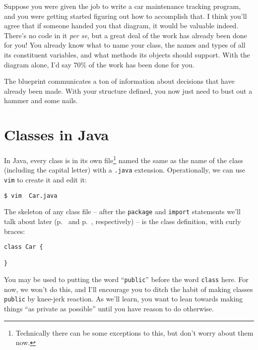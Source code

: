 Suppose you were given the job to write a car maintenance tracking program, and
you were getting started figuring out how to accomplish that. I think you'll
agree that if someone handed you that diagram, it would be valuable indeed.
There's no code in it \textit{per se}, but a great deal of the work has already
been done for you! You already know what to name your class, the names and
types of all its constituent variables, and what methods its objects should
support. With the diagram alone, I'd say 70\% of the work has been done for
you.

The blueprint communicates a ton of information about decisions that have
already been made. With your structure defined, you now just need to bust out a
hammer and some nails.


\section{Classes in Java}

In Java, every class is in its own file\footnote{Technically there can be
some exceptions to this, but don't worry about them now.} named the same as
the name of the class (including the capital letter) with a \texttt{.java}
extension. Operationally, we can use \texttt{vim} to create it and edit it:

\begin{verbatim}
$ vim  Car.java
\end{verbatim}

The skeleton of any class file -- after the \texttt{package} and
\texttt{import} statements we'll talk about later (p.~\pageref{sec:packages}
and p.~\pageref{sec:import}, respectively) -- is the class definition, with
curly braces:

\begin{Verbatim}[samepage=true,fontsize=\footnotesize,frame=single]
class Car {
    
}
\end{Verbatim}

You may be used to putting the word ``\texttt{public}'' before the word
\texttt{class} here. For now, we won't do this, and I'll encourage you to
ditch the habit of making classes \texttt{public} by knee-jerk reaction. As
we'll learn, you want to lean towards making things ``as private as possible''
until you have reason to do otherwise.

